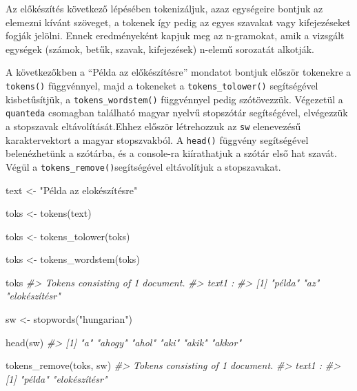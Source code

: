 \documentclass[
]{book}
\newenvironment{Shaded}{\begin{snugshade}}{\end{snugshade}}
\newcommand{\CommentTok}[1]{\textcolor[rgb]{0.56,0.35,0.01}{\textit{#1}}}
\newcommand{\FunctionTok}[1]{\textcolor[rgb]{0.00,0.00,0.00}{#1}}
\newcommand{\NormalTok}[1]{#1}
\newcommand{\OtherTok}[1]{\textcolor[rgb]{0.56,0.35,0.01}{#1}}
\newcommand{\StringTok}[1]{\textcolor[rgb]{0.31,0.60,0.02}{#1}}
\begin{document}
Az előkészítés következő lépésében tokenizáljuk, azaz egységeire bontjuk
az elemezni kívánt szöveget, a tokenek így pedig az egyes szavakat vagy
kifejezéseket fogják jelölni. Ennek eredményeként kapjuk meg az
n-gramokat, amik a vizsgált egységek (számok, betűk, szavak,
kifejezések) n-elemű sorozatát alkotják.

A következőkben a ``Példa az előkészítésre'' mondatot bontjuk először
tokenekre a \texttt{tokens()} függvénnyel, majd a tokeneket a
\texttt{tokens\_tolower()} segítségével kisbetűsítjük, a
\texttt{tokens\_wordstem()} függvénnyel pedig szótövezzük. Végezetül a
\texttt{quanteda} csomagban található magyar nyelvű stopszótár
segítségével, elvégezzük a stopszavak eltávolítását.Ehhez először
létrehozzuk az \texttt{sw} elenevezésű karaktervektort a magyar
stopszvakból. A \texttt{head()} függvény segítségével belenézhetünk a
szótárba, és a console-ra kiírathatjuk a szótár első hat szavát. Végül a
\texttt{tokens\_remove()}segítségével eltávolítjuk a stopszavakat.

\begin{Shaded}
\begin{Highlighting}[]

\NormalTok{text }\OtherTok{\textless{}{-}} \StringTok{"Példa az elokészítésre"}

\NormalTok{toks }\OtherTok{\textless{}{-}} \FunctionTok{tokens}\NormalTok{(text)}

\NormalTok{toks }\OtherTok{\textless{}{-}} \FunctionTok{tokens\_tolower}\NormalTok{(toks)}

\NormalTok{toks }\OtherTok{\textless{}{-}} \FunctionTok{tokens\_wordstem}\NormalTok{(toks)}

\NormalTok{toks}
\CommentTok{\#\textgreater{} Tokens consisting of 1 document.}
\CommentTok{\#\textgreater{} text1 :}
\CommentTok{\#\textgreater{} [1] "példa"        "az"           "elokészítésr"}

\NormalTok{sw }\OtherTok{\textless{}{-}} \FunctionTok{stopwords}\NormalTok{(}\StringTok{"hungarian"}\NormalTok{)}

\FunctionTok{head}\NormalTok{(sw)}
\CommentTok{\#\textgreater{} [1] "a"     "ahogy" "ahol"  "aki"   "akik"  "akkor"}

\FunctionTok{tokens\_remove}\NormalTok{(toks, sw)}
\CommentTok{\#\textgreater{} Tokens consisting of 1 document.}
\CommentTok{\#\textgreater{} text1 :}
\CommentTok{\#\textgreater{} [1] "példa"        "elokészítésr"}
\end{Highlighting}
\end{Shaded}
\end{document}
